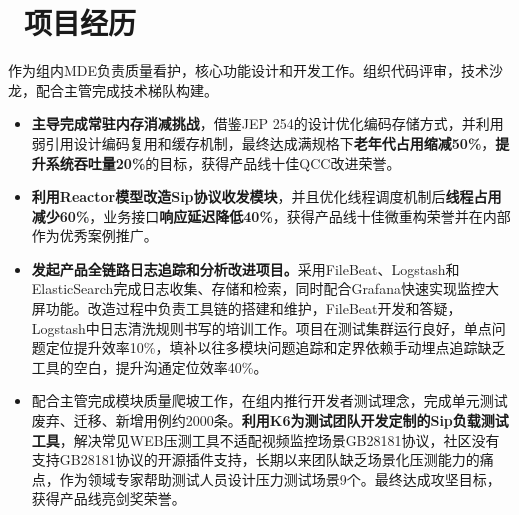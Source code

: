\documentclass{resume}
\begin{document}



\section{\faBriefcase\ 项目经历}

\begin{onehalfspacing}
作为组内MDE负责质量看护，核心功能设计和开发工作。组织代码评审，技术沙龙，配合主管完成技术梯队构建。
\begin{itemize}
  \item \textbf{主导完成常驻内存消减挑战}，借鉴JEP 254的设计优化编码存储方式，并利用弱引用设计编码复用和缓存机制，最终达成满规格下\textbf{老年代占用缩减50\%}，\textbf{提升系统吞吐量20\%}的目标，获得产品线十佳QCC改进荣誉。
  \item \textbf{利用Reactor模型改造Sip协议收发模块}，并且优化线程调度机制后\textbf{线程占用减少60\%}，业务接口\textbf{响应延迟降低40\%}，获得产品线十佳微重构荣誉并在内部作为优秀案例推广。
  \item \textbf{发起产品全链路日志追踪和分析改进项目。}采用FileBeat、Logstash和ElasticSearch完成日志收集、存储和检索，同时配合Grafana快速实现监控大屏功能。改造过程中负责工具链的搭建和维护，FileBeat开发和答疑，Logstash中日志清洗规则书写的培训工作。项目在测试集群运行良好，单点问题定位提升效率10\%，填补以往多模块问题追踪和定界依赖手动埋点追踪缺乏工具的空白，提升沟通定位效率40\%。
  \item 配合主管完成模块质量爬坡工作，在组内推行开发者测试理念，完成单元测试废弃、迁移、新增用例约2000条。\textbf{利用K6为测试团队开发定制的Sip负载测试工具}，解决常见WEB压测工具不适配视频监控场景GB28181协议，社区没有支持GB28181协议的开源插件支持，长期以来团队缺乏场景化压测能力的痛点，作为领域专家帮助测试人员设计压力测试场景9个。最终达成攻坚目标，获得产品线亮剑奖荣誉。
\end{itemize}
\end{onehalfspacing}
\end{document}
